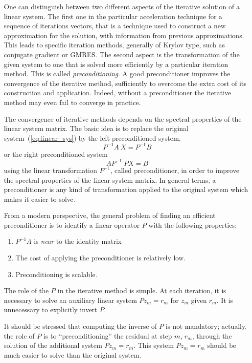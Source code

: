 One can distinguish between two different aspects of the iterative
solution of a linear system. The first one in the particular
acceleration technique for a sequence of iterations vectors, that is a
technique used to construct a new approximation for the solution, with
information from previous approximations.  This leads to specific
iteration methods, generally of Krylov type, such as conjugate gradient
or GMRES. The second aspect is the transformation of the given system to
one that is solved more efficiently by a particular iteration
method. This is called {\em preconditioning}.  A good preconditioner
improves the convergence of the iterative method, sufficiently to
overcome the extra cost of its construction and application. Indeed,
without a preconditioner the iterative method may even fail to converge
in practice.

The convergence of iterative methods depends on the spectral properties
of the linear system matrix. The basic idea is to replace the original
system~(\ref{eq:linear_sys}) by
the left preconditioned system,
\[
P^{-1} A ~ X = P^{-1} B
\]
or the right preconditioned system
\[
A P^{-1} ~ P X = B
\]
using the linear transformation $P^{-1}$,
called preconditioner, in order to improve the spectral properties of
the linear system matrix. In general terms, a preconditioner is any
kind of transformation applied to the original system which makes it
easier to solve.

From a modern perspective, the general problem of finding an efficient
preconditioner is to identify a linear operator $P$ with the following
properties:
\begin{enumerate}
\item $P^{-1} A$ is {\em near} to the identity matrix 
\item The cost of applying the preconditioner is relatively low.
\item Preconditioning is scalable.
\end{enumerate}

The role of the $P$ in the iterative method is simple. At each
iteration, it is necessary to solve an auxiliary linear system
$P z_m = r_m$ for $z_m$ given $r_m$.
It is unnecessary to explicitly invert $P$.

It should be stressed that computing the inverse of $P$ is not
mandatory; actually, the role of $P$ is to ``preconditioning'' the
residual at step $m$, $r_m$, through the solution of the additional
system $P z_m = r_m$. This system $P z_m = {r}_m$ should be much easier
to solve than the original system.

